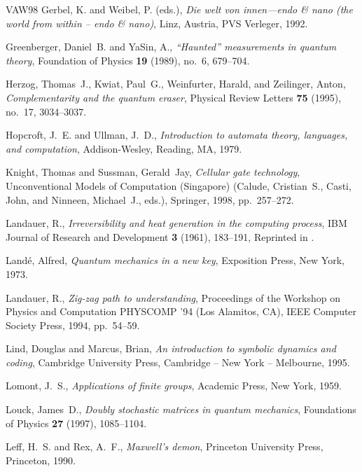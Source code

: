 \begin{thebibliography}{VAW{\etalchar{+}}98}
Gerbel, K. and Weibel, P. (eds.), {\em Die welt von innen---endo \& nano (the
  world from within -- endo \& nano)}, Linz, Austria, PVS Verleger, 1992.

Greenberger, Daniel~B. and YaSin, A., {\em ``{H}aunted'' measurements in
  quantum theory}, Foundation of Physics {\bf 19} (1989), no.~6, 679--704.

Herzog, Thomas~J., Kwiat, Paul~G., Weinfurter, Harald, and Zeilinger, Anton,
  {\em Complementarity and the quantum eraser}, Physical Review Letters {\bf
  75} (1995), no.~17, 3034--3037.

Hopcroft, J.~E. and Ullman, J.~D., {\em Introduction to automata theory,
  languages, and computation}, Addison-Wesley, Reading, MA, 1979.

Knight, Thomas and Sussman, Gerald~Jay, {\em Cellular gate technology},
  Unconventional Models of Computation (Singapore) (Calude, Cristian~S., Casti,
  John, and Ninneen, Michael~J., eds.), Springer, 1998, pp.~257--272.

Landauer, R., {\em Irreversibility and heat generation in the computing
  process}, IBM Journal of Research and Development {\bf 3} (1961), 183--191,
  Reprinted in \cite[pp. 188-196]{maxwell-demon}.

Land{\'{e}}, Alfred, {\em Quantum mechanics in a new key}, Exposition Press,
  New York, 1973.

Landauer, R., {\em Zig-zag path to understanding}, Proceedings of the Workshop
  on Physics and Computation PHYSCOMP '94 (Los Alamitos, CA), IEEE Computer
  Society Press, 1994, pp.~54--59.

Lind, Douglas and Marcus, Brian, {\em An introduction to symbolic dynamics and
  coding}, Cambridge University Press, Cambridge -- New York -- Melbourne,
  1995.

Lomont, J.~S., {\em Applications of finite groups}, Academic Press, New York,
  1959.

Louck, James~D., {\em Doubly stochastic matrices in quantum mechanics},
  Foundations of Physics {\bf 27} (1997), 1085--1104.

Leff, H.~S. and Rex, A.~F., {\em Maxwell's demon}, Princeton University Press,
  Princeton, 1990.


\end{thebibliography}

